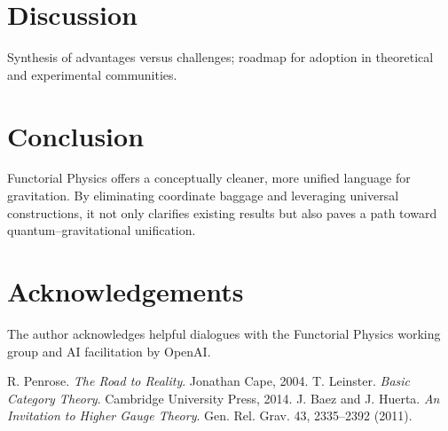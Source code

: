\documentclass[11pt]{article}
\begin{document}
\section{Discussion}
Synthesis of advantages versus challenges; roadmap for adoption in theoretical and experimental communities.

\section{Conclusion}
Functorial Physics offers a conceptually cleaner, more unified language for gravitation. By eliminating coordinate baggage and leveraging universal constructions, it not only clarifies existing results but also paves a path toward quantum--gravitational unification.

\section*{Acknowledgements}
The author acknowledges helpful dialogues with the Functorial Physics working group and AI facilitation by OpenAI.


\begin{thebibliography}{10}
 R. Penrose. \emph{The Road to Reality}. Jonathan Cape, 2004.
 T. Leinster. \emph{Basic Category Theory}. Cambridge University Press, 2014.
 J. Baez and J. Huerta. \emph{An Invitation to Higher Gauge Theory}. Gen. Rel. Grav. 43, 2335--2392 (2011).
\end{thebibliography}
\end{document}
